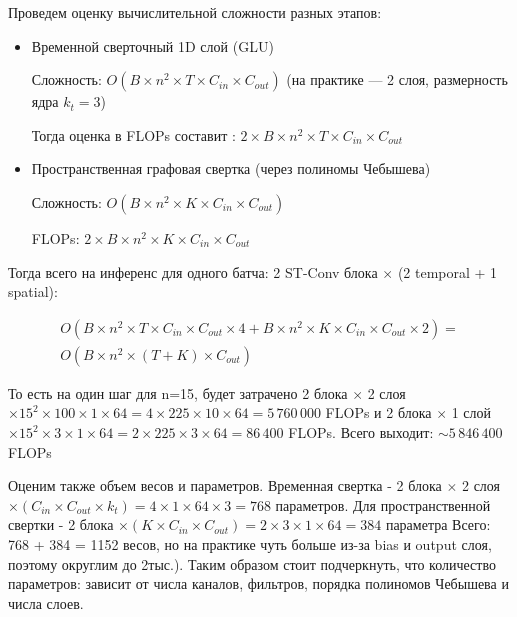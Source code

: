 Проведем оценку вычислительной сложности разных этапов:

\begin{itemize}
\item Временной сверточный 1D слой (GLU)

Сложность: $O(B \times n^2 \times T \times C_{in} \times C_{out})$ (на практике — 2 слоя, размерность ядра $k_t=3$)

Тогда оценка в FLOPs составит : $2 \times B \times n^2 \times T \times C_{in} \times C_{out}$

\item Пространственная графовая свертка (через полиномы Чебышева)

Сложность: $O(B \times n^2 \times K \times C_{in} \times C_{out})$

FLOPs: $2 \times B \times n^2 \times K \times C_{in} \times C_{out}$
\end{itemize}
	
Тогда всего на инференс для одного батча: 2 ST-Conv блока $\times$ (2 temporal + 1 spatial):

\begin{equation}
	\begin{split}
	O(B \times n^2 \times T \times C_{in} \times C_{out} \times 4 + B \times n^2 \times K \times C_{in} \times C_{out} \times 2) = \\
	O(B \times n^2 \times (T+K) \times C_{out})
	\end{split}
\end{equation}

То есть на один шаг для n=15,  будет затрачено 2 блока $\times$ 2 слоя $\times 15^2 \times 100 \times 1 \times 64 = 4 \times 225 \times 10 \times 64 = 5\,760\,000$ FLOPs и 2 блока $\times$ 1 слой $\times 15^2 \times 3 \times 1 \times 64 = 2 \times 225 \times 3 \times 64 = 86\,400$ FLOPs. Всего выходит: $\sim5\,846\,400$ FLOPs


Оценим также объем весов и параметров. Временная свертка - 2 блока $\times$ 2 слоя $\times (C_{in} \times C_{out} \times k_{t}) = 4 \times 1 \times 64 \times 3 = 768$ параметров.
Для пространственной свертки -  2 блока $\times (K \times C_{in} \times C_{out}) = 2 \times 3 \times 1 \times 64 = 384$ параметра
Всего: 768 + 384 = 1152 весов, но на практике чуть больше из-за bias и output слоя, поэтому округлим до 2тыс.). Таким образом стоит подчеркнуть, что количество параметров: зависит от числа каналов, фильтров, порядка полиномов Чебышева и числа слоев.



